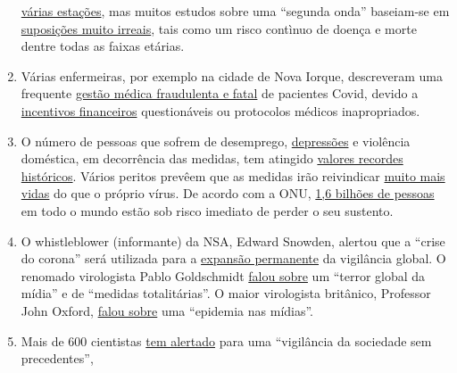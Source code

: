 \begin{enumerate}
  \href{https://www.britannica.com/event/1968-flu-pandemic}{várias
  estações}, mas muitos estudos sobre uma ``segunda onda'' baseiam-se em
  \href{https://www.heise.de/tp/features/Fellay-Studie-Zweite-Corona-Welle-4726303.html}{suposições
  muito irreais}, tais como um risco contìnuo de doença e morte dentre
  todas as faixas etárias.
\item
  Várias enfermeiras, por exemplo na cidade de Nova Iorque, descreveram
  uma frequente
  \href{https://www.youtube.com/watch?v=UIDsKdeFOmQ}{gestão médica
  fraudulenta e fatal} de pacientes Covid, devido a
  \href{https://eu.usatoday.com/story/news/factcheck/2020/04/24/fact-check-medicare-hospitals-paid-more-covid-19-patients-coronavirus/3000638001/}{incentivos
  financeiros} questionáveis ou protocolos médicos inapropriados.
\item
  O número de pessoas que sofrem de desemprego,
  \href{https://www.indystar.com/story/news/health/2020/04/03/coronavirus-indiana-how-get-help-mental-health-addiction/5104357002/}{depressões}
  e violência doméstica, em decorrência das medidas, tem atingido
  \href{https://www.businessinsider.com/us-weekly-jobless-claims-unemployment-filings-coronavirus-labor-market-layoffs-2020-5}{valores
  recordes históricos}. Vários peritos prevêem que as medidas irão
  reivindicar
  \href{https://www.nytimes.com/2020/03/20/opinion/coronavirus-pandemic-social-distancing.html}{muito
  mais vidas} do que o próprio vírus. De acordo com a ONU,
  \href{https://www.theguardian.com/world/2020/apr/29/half-of-worlds-workers-at-immediate-risk-of-losing-livelihood-due-to-coronavirus}{1,6
  bilhões de pessoas} em todo o mundo estão sob risco imediato de perder
  o seu sustento.
\item
  O whistleblower (informante) da NSA, Edward Snowden, alertou que a
  ``crise do corona'' será utilizada para a
  \href{https://www.youtube.com/watch?v=-pcQFTzck_c}{expansão
  permanente} da vigilância global. O renomado virologista Pablo
  Goldschmidt
  \href{https://www.rubikon.news/artikel/der-corona-totalitarismus}{falou
  sobre} um ``terror global da mídia'' e de ``medidas totalitárias''. O
  maior virologista britânico, Professor John Oxford,
  \href{https://novuscomms.com/2020/03/31/a-view-from-the-hvivo-open-orphan-orph-laboratory-professor-john-oxford/}{falou
  sobre} uma ``epidemia nas mídias''.
\item
  Mais de 600 cientistas
  \href{https://www.esat.kuleuven.be/cosic/sites/contact-tracing-joint-statement/}{tem
  alertado} para uma ``vigilância da sociedade sem precedentes'',

\end{enumerate}
